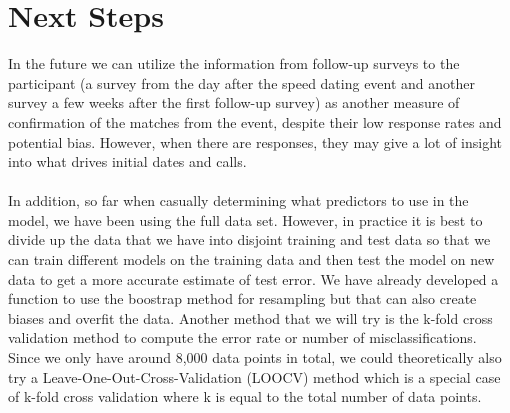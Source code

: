 \documentclass{article}
\begin{document}
\section{Next Steps}
In the future we can utilize the information from follow-up surveys to the participant (a survey from the day after the speed dating event and another survey a few weeks after the first follow-up survey) as another measure of confirmation of the matches from the event, despite their low response rates and potential bias.  However, when there are responses, they may give a lot of insight into what drives initial dates and calls.\\
\null\\
In addition, so far when casually determining what predictors to use in the model, we have been using the full data set.  However, in practice it is best to divide up the data that we have into disjoint training and test data so that we can train different models on the training data and then test the model on new data to get a more accurate estimate of test error.  We have already developed a function to use the boostrap method for resampling but that can also create biases and overfit the data.  Another method that we will try is the k-fold cross validation method to compute the error rate or number of misclassifications.  Since we only have around 8,000 data points in total, we could theoretically also try a Leave-One-Out-Cross-Validation (LOOCV) method which is a special case of k-fold cross validation where k is equal to the total number of data points.\\
\end{document}
